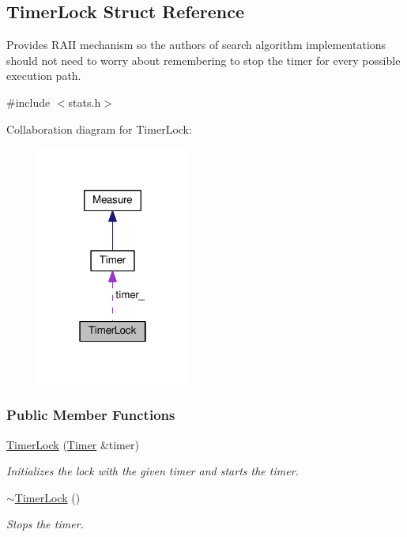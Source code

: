 \hypertarget{structTimerLock}{}\subsection{Timer\+Lock Struct Reference}
\label{structTimerLock}


Provides R\+A\+II mechanism so the authors of search algorithm implementations should not need to worry about remembering to stop the timer for every possible execution path.  




{\ttfamily \#include $<$stats.\+h$>$}



Collaboration diagram for Timer\+Lock\+:\nopagebreak
\begin{figure}[H]
\begin{center}
\leavevmode
\includegraphics[width=142pt]{structTimerLock__coll__graph}
\end{center}
\end{figure}
\subsubsection*{Public Member Functions}
\begin{DoxyCompactItemize}
\item 
\hyperlink{structTimerLock_a736c692f0f32a3c18eacbedcbe828809}{Timer\+Lock} (\hyperlink{structTimer}{Timer} \&timer)\hypertarget{structTimerLock_a736c692f0f32a3c18eacbedcbe828809}{}\label{structTimerLock_a736c692f0f32a3c18eacbedcbe828809}

\begin{DoxyCompactList}\small\item\em Initializes the lock with the given timer and starts the timer. \end{DoxyCompactList}\item 
\hyperlink{structTimerLock_a43841ef1b05ca49869c1d9204bab114a}{$\sim$\+Timer\+Lock} ()\hypertarget{structTimerLock_a43841ef1b05ca49869c1d9204bab114a}{}\label{structTimerLock_a43841ef1b05ca49869c1d9204bab114a}

\begin{DoxyCompactList}\small\item\em Stops the timer. \end{DoxyCompactList}\end{DoxyCompactItemize}
